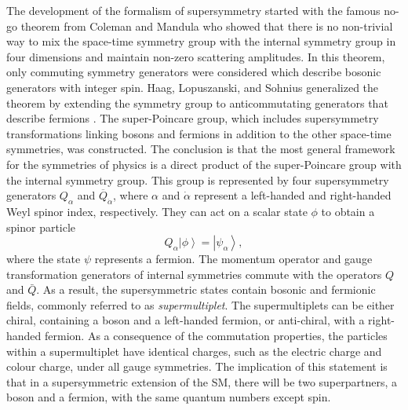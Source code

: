 The development of the formalism of supersymmetry started with the famous no-go theorem from Coleman and 
Mandula \cite{Coleman:1967ad} who showed that there is no non-trivial way to mix the space-time symmetry 
group with the internal symmetry group in four dimensions and maintain non-zero scattering amplitudes. 
In this theorem, 
only commuting symmetry generators were considered which describe bosonic generators with integer spin.
Haag, Lopuszanski, and Sohnius generalized the theorem by extending the symmetry group to 
anticommutating generators that describe fermions \cite{Haag:1974qh}.
The super-Poincare group, which includes supersymmetry transformations linking bosons and 
fermions in addition to the other space-time symmetries, was constructed. 
The conclusion is that the most general framework for the symmetries of physics is a direct product of the 
super-Poincare group with the internal symmetry group.
 This group is represented by four supersymmetry generators $Q_\alpha$ and $\overline{Q}_{\dot{\alpha}}$, 
 where  $\alpha$ and  $\dot{\alpha}$ represent a left-handed and right-handed Weyl spinor index, respectively.
 They can act on a scalar state $\phi$ to obtain a spinor particle
 \begin{equation}
 Q_\alpha \left|\phi\right>  = \left|\psi_\alpha\right>,
 \end{equation}
 where the state $\psi$ represents a fermion. 
The momentum operator and gauge transformation generators of internal symmetries commute with the operators 
$Q$ and $\bar{Q}$. As a result, the supersymmetric states contain bosonic and fermionic fields, 
commonly referred to as \textit{supermultiplet}. The supermultiplets can be either chiral, containing a boson
and a left-handed fermion, or anti-chiral, with a right-handed fermion.
As a consequence of the commutation properties, the particles within a supermultiplet have identical charges, 
such as the electric charge and colour charge, under all gauge symmetries.
The implication of this statement is that in a supersymmetric extension of the SM, there will be two 
superpartners, a boson and a fermion, with the same quantum numbers except spin. 

